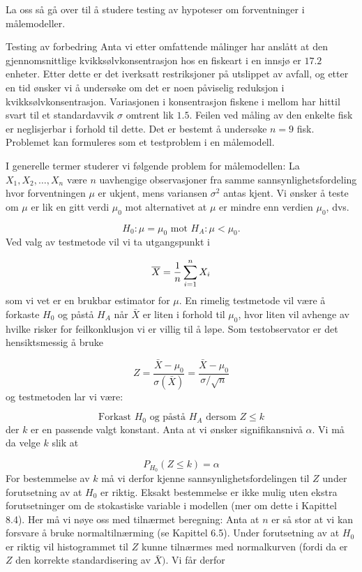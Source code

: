 La oss så gå over til å studere testing av hypoteser
om forventninger i målemodeller.\\

\begin{eksempel}{Testing av forbedring}
Anta vi etter omfattende målinger har anslått at den
gjennomsnittlige kvikksølvkonsentrasjon hos en fiskeart i en
innsjø er $17.2$ enheter. Etter dette er det iverksatt
restriksjoner på utslippet av avfall, og etter en tid ønsker vi å
undersøke om det er noen påviselig reduksjon i
kvikksølvkonsen\-trasjon. Variasjonen i konsentrasjon fiskene i mellom
har hittil svart til et stan\-dard\-avvik $\sigma$ omtrent lik $1.5$. 
Feilen ved måling av den enkelte fisk er neglisjerbar i forhold til dette.
Det er bestemt å undersøke $n=9$ fisk.
Problemet kan formuleres som et testproblem i en målemodell.
\end{eksempel}

I generelle termer studerer vi følgende problem for
målemodellen:
La $X_1, X_2,\ldots ,X_n$ være $n$ uavhengige observasjoner fra
samme sannsynlighetsfordeling hvor forventningen $\mu$ er ukjent,
mens variansen $\sigma ^2$ antas kjent. Vi ønsker å teste
om $\mu$ er lik en gitt verdi $\mu_0$ mot alternativet at $\mu$
er mindre enn verdien ${\mu}_0$, dvs.

\[ H_0:\mu ={\mu}_0 \mbox{\ \ mot \ \ } H_A:\mu < {\mu}_0.\]
Ved valg av testmetode vil vi ta utgangspunkt i 

\[  \bar X={1\over n}\sum_{i=1}^n X_i\]
som vi vet er en brukbar estimator for $\mu$. En rimelig
testmetode vil være å forkaste $H_0$ og påstå
$H_A$ når $\bar X$ er liten i forhold til ${\mu}_0$, hvor liten
vil avhenge av hvilke risker for feilkonklusjon vi er villig til
å løpe. Som testobservator er det hensiktsmessig å
bruke 

\[Z =\frac{\bar{X}-{\mu}_0}{ \sigma (\bar{X})}=\frac{\bar X -{\mu}_0}
                                    {\sigma /\sqrt{n}}     \]
og testmetoden lar vi være:

\[ \mbox{Forkast $H_0$ og påstå $H_A$ dersom $Z\le k$} \]
der $k$ er en passende valgt konstant. Anta at vi ønsker
signifikansnivå $\alpha$. Vi må da velge $k$ slik at 

\[  P_{H_0}(Z\le k)=\alpha        \]
For bestemmelse av $k$ må vi derfor kjenne
sannsynlighetsfordelingen til $Z$ under forutsetning av at $H_0$
er riktig. Eksakt bestemmelse er ikke mulig uten ekstra
forutsetninger om de stokastiske variable i modellen (mer om
dette i Kapittel 8.4). Her må vi nøye oss med
tilnærmet beregning: Anta at $n$ er så stor at vi kan
forsvare å bruke normaltilnærming (se Kapittel 6.5).
Under forutsetning av at $H_0$ er riktig vil histogrammet til $Z$
kunne tilnærmes med normalkurven (fordi da er $Z$ den
korrekte standardisering av $\bar X)$. Vi får derfor 


